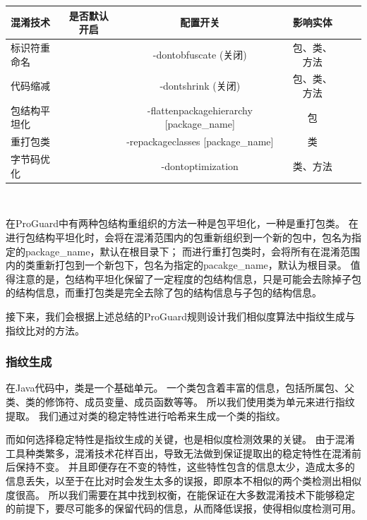 \begin{table}[!hpb]
	\centering
	\begin{tabularx}{\textwidth}{|X|c|c|c|X|X}
		\hline
		混淆技术 & 是否默认开启 & 配置开关 & 影响实体\\
		\hline
		标识符重命名 & \cmark & -dontobfuscate (关闭) & 包、类、方法\\
		\hline
		代码缩减 & \cmark & -dontshrink (关闭) & 包、类、方法\\
		\hline
		包结构平坦化 & \xmark & -flattenpackagehierarchy [package\_name] & 包\\
		\hline
		重打包类 & \xmark & -repackageclasses [package\_name] & 类\\
		\hline
		字节码优化 & \xmark & -dontoptimization & 类、方法\\
		\hline
	\end{tabularx}\\
\end{table}

在ProGuard中有两种包结构重组织的方法一种是包平坦化，一种是重打包类。
在进行包结构平坦化时，会将在混淆范围内的包重新组织到一个新的包中，包名为指定的package\_name，默认在根目录下；
而进行重打包类时，会将所有在混淆范围内的类重新打包到一个新包下，包名为指定的pacakge\_name，默认为根目录。
值得注意的是，包结构平坦化保留了一定程度的包结构信息，只是可能会去除掉子包的结构信息，而重打包类是完全去除了包的结构信息与子包的结构信息。

接下来，我们会根据上述总结的ProGuard规则设计我们相似度算法中指纹生成与指纹比对的方法。

\subsubsection{指纹生成}

在Java代码中，类是一个基础单元。
一个类包含着丰富的信息，包括所属包、父类、类的修饰符、成员变量、成员函数等等。
所以我们使用类为单元来进行指纹提取。
我们通过对类的稳定特性进行哈希来生成一个类的指纹。

而如何选择稳定特性是指纹生成的关键，也是相似度检测效果的关键。
由于混淆工具种类繁多，混淆技术花样百出，导致无法做到保证提取出的稳定特性在混淆前后保持不变。
并且即便存在不变的特性，这些特性包含的信息太少，造成太多的信息丢失，以至于在比对时会发生太多的误报，即原本不相似的两个类检测出相似度很高。
所以我们需要在其中找到权衡，在能保证在大多数混淆技术下能够稳定的前提下，要尽可能多的保留代码的信息，从而降低误报，使得相似度检测可用。


